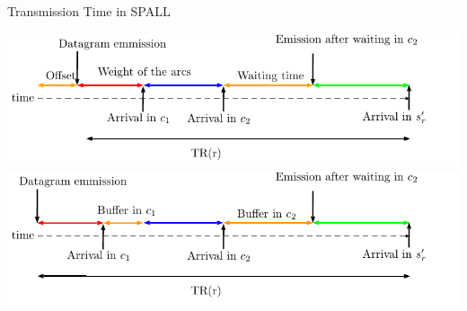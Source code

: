 \documentclass[10 pt]{beamer}
\begin{document}
\begin{frame}{Transmission Time in SPALL}
\begin{center}
{\begin{tikzpicture}
\end{tikzpicture}
}

\end{center}
 \begin{overprint}

\includegraphics[width=\textwidth]{time.pdf}
\includegraphics[width=\textwidth]{time2.pdf}

\end{overprint}

\end{frame}
\end{document}
